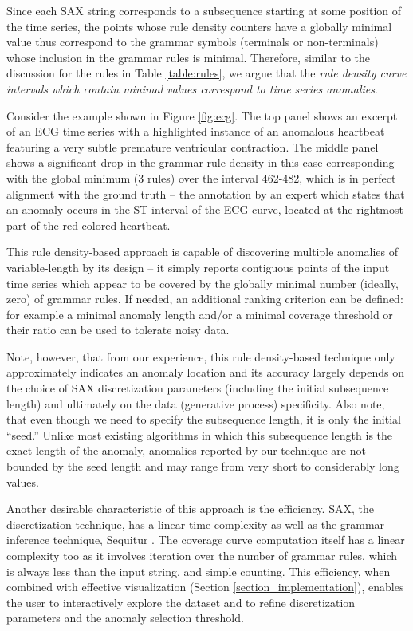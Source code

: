 \documentclass{llncs}
\begin{document}
Since each SAX string corresponds to a subsequence starting at some position of the time series, the points whose rule density counters have a globally minimal value thus correspond to the grammar symbols (terminals or non-terminals) whose inclusion in the grammar rules is minimal. Therefore, similar to the discussion for the rules in Table \ref{table:rules}, we argue that the \textit{rule density curve intervals which contain minimal values correspond to time series anomalies}. 

Consider the example shown in Figure \ref{fig:ecg}. The top panel shows an excerpt of an ECG time series with a highlighted instance of an anomalous heartbeat featuring a very subtle premature ventricular contraction. The middle panel shows a significant drop in the grammar rule density in this case corresponding with the global minimum (3 rules) over the interval 462-482, which is in perfect alignment with the ground truth -- the annotation by an expert which states that an anomaly occurs in the ST interval of the ECG curve, located at the rightmost part of the red-colored heartbeat.  

This rule density-based approach is capable of discovering multiple anomalies of variable-length by its design -- it simply reports contiguous points of the input time series which appear to be covered by the globally minimal number (ideally, zero) of grammar rules. If needed, an additional ranking criterion can be defined: for example a minimal anomaly length and/or a minimal coverage threshold or their ratio can be used to tolerate noisy data.

Note, however, that from our experience, this rule density-based technique only approximately indicates an anomaly location and its accuracy largely depends on the choice of SAX discretization parameters (including the initial subsequence length) and ultimately on the data (generative process) specificity. Also note, that even though we need to specify the subsequence length, it is only the initial ``seed.'' Unlike most existing algorithms in which this subsequence length is the exact length of the anomaly, anomalies reported by our technique are not bounded by the seed length and may range from very short to considerably long values.
\enlargethispage{\baselineskip}

Another desirable characteristic of this approach is the efficiency. SAX, the discretization technique, has a linear time complexity \cite{hot_sax} as well as the grammar inference technique, Sequitur \cite{sequitur}. The coverage curve computation itself has a linear complexity too as it involves iteration over the number of grammar rules, which is always less than the input string, and simple counting. This efficiency, when combined with effective visualization (Section \ref{section_implementation}), enables the user to interactively explore the dataset and to refine discretization parameters and the anomaly selection threshold.
\end{document}
